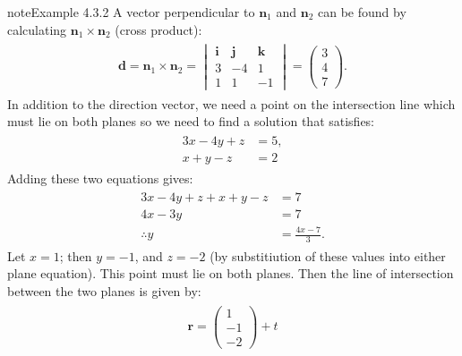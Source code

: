 \documentclass[letterpaper,10pt,english]{jupyterBook}
\begin{document}
\begin{sphinxadmonition}{note}{Example 4.3.2}
\sphinxAtStartPar
A vector perpendicular to \(\mathbf{n}_1\) and \(\mathbf{n}_2\) can be found by calculating \(\mathbf{n}_1 \times \mathbf{n}_2\) (cross product):
\begin{equation*}
\begin{split} \begin{align*}
    \mathbf{d} = \mathbf{n}_1 \times \mathbf{n}_2 =
    \begin{vmatrix}
        \mathbf{i} & \mathbf{j} & \mathbf{k} \\
        3 & -4 & 1 \\
        1 & 1 & -1
    \end{vmatrix} =
    \begin{pmatrix} 3 \\ 4 \\ 7 \end{pmatrix}.
\end{align*} \end{split}
\end{equation*}
\sphinxAtStartPar
In addition to the direction vector, we need a point on the intersection line which must lie on both planes \sphinxhyphen{} so we need to find a solution that satisfies:
\begin{equation*}
\begin{split} \begin{align*}
    3x - 4y + z &= 5, \\
    x + y - z &= 2
\end{align*} \end{split}
\end{equation*}
\sphinxAtStartPar
Adding these two equations gives:
\begin{equation*}
\begin{split} \begin{align*}
    3x - 4y + z + x + y -z &= 7 \\
    4x - 3y &= 7\\
    \therefore y &= \frac{4x - 7}{3}.
\end{align*} \end{split}
\end{equation*}
\sphinxAtStartPar
Let \(x = 1\); then \(y = -1\), and \(z = -2\) (by substitiution of these values into either plane equation). This point must lie on both planes. Then the line of intersection between the two planes is given by:
\begin{equation*}
\begin{split} \begin{align*}
    \mathbf{r} = \begin{pmatrix} 1 \\ -1 \\ -2 \end{pmatrix} + t

\end{align*}
\end{split}
\end{equation*}
\end{sphinxadmonition}
\end{document}
